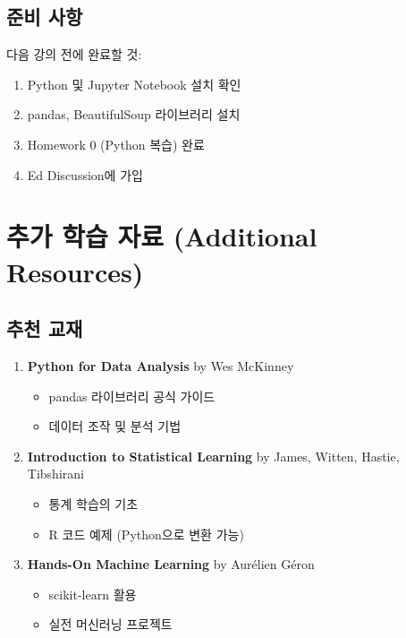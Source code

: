 \documentclass[12pt,a4paper]{article}
\begin{document}
\subsection{준비 사항}

다음 강의 전에 완료할 것:
\begin{enumerate}
    \item Python 및 Jupyter Notebook 설치 확인
    \item pandas, BeautifulSoup 라이브러리 설치
    \item Homework 0 (Python 복습) 완료
    \item Ed Discussion에 가입
\end{enumerate}

\section{추가 학습 자료 (Additional Resources)}

\subsection{추천 교재}

\begin{enumerate}
    \item \textbf{Python for Data Analysis} by Wes McKinney
    \begin{itemize}
        \item pandas 라이브러리 공식 가이드
        \item 데이터 조작 및 분석 기법
    \end{itemize}

    \item \textbf{Introduction to Statistical Learning} by James, Witten, Hastie, Tibshirani
    \begin{itemize}
        \item 통계 학습의 기초
        \item R 코드 예제 (Python으로 변환 가능)
    \end{itemize}

    \item \textbf{Hands-On Machine Learning} by Aurélien Géron
    \begin{itemize}
        \item scikit-learn 활용
        \item 실전 머신러닝 프로젝트
    \end{itemize}
\end{enumerate}
\end{document}
